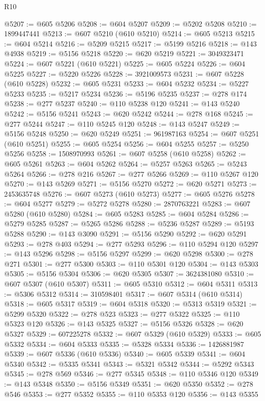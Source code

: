 \begin{lexlean}{R10}
\begin{coremodule}
@5207 := @605 @5206
@5208 := @604 @5207
@5209 := @5202 @5208
@5210 := 1899447441
@5213 := @607 @5210 (@610 @5210)
@5214 := @605 @5213
@5215 := @604 @5214
@5216 := @5209 @5215
@5217 := @5199 @5216
@5218 := @143 @4938
@5219 := @5156 @5218
@5220 := @620 @5219
@5221 := 3049323471
@5224 := @607 @5221 (@610 @5221)
@5225 := @605 @5224
@5226 := @604 @5225
@5227 := @5220 @5226
@5228 := 3921009573
@5231 := @607 @5228 (@610 @5228)
@5232 := @605 @5231
@5233 := @604 @5232
@5234 := @5227 @5233
@5235 := @5217 @5234
@5236 := @5196 @5235
@5237 := @278 @174
@5238 := @277 @5237
@5240 := @110 @5238 @120
@5241 := @143 @5240
@5242 := @5156 @5241
@5243 := @620 @5242
@5244 := @278 @168
@5245 := @277 @5244
@5247 := @110 @5245 @120
@5248 := @143 @5247
@5249 := @5156 @5248
@5250 := @620 @5249
@5251 := 961987163
@5254 := @607 @5251 (@610 @5251)
@5255 := @605 @5254
@5256 := @604 @5255
@5257 := @5250 @5256
@5258 := 1508970993
@5261 := @607 @5258 (@610 @5258)
@5262 := @605 @5261
@5263 := @604 @5262
@5264 := @5257 @5263
@5265 := @5243 @5264
@5266 := @278 @216
@5267 := @277 @5266
@5269 := @110 @5267 @120
@5270 := @143 @5269
@5271 := @5156 @5270
@5272 := @620 @5271
@5273 := 2453635748
@5276 := @607 @5273 (@610 @5273)
@5277 := @605 @5276
@5278 := @604 @5277
@5279 := @5272 @5278
@5280 := 2870763221
@5283 := @607 @5280 (@610 @5280)
@5284 := @605 @5283
@5285 := @604 @5284
@5286 := @5279 @5285
@5287 := @5265 @5286
@5288 := @5236 @5287
@5289 := @5193 @5288
@5290 := @143 @3090
@5291 := @5156 @5290
@5292 := @620 @5291
@5293 := @278 @403
@5294 := @277 @5293
@5296 := @110 @5294 @120
@5297 := @143 @5296
@5298 := @5156 @5297
@5299 := @620 @5298
@5300 := @278 @271
@5301 := @277 @5300
@5303 := @110 @5301 @120
@5304 := @143 @5303
@5305 := @5156 @5304
@5306 := @620 @5305
@5307 := 3624381080
@5310 := @607 @5307 (@610 @5307)
@5311 := @605 @5310
@5312 := @604 @5311
@5313 := @5306 @5312
@5314 := 310598401
@5317 := @607 @5314 (@610 @5314)
@5318 := @605 @5317
@5319 := @604 @5318
@5320 := @5313 @5319
@5321 := @5299 @5320
@5322 := @278 @523
@5323 := @277 @5322
@5325 := @110 @5323 @120
@5326 := @143 @5325
@5327 := @5156 @5326
@5328 := @620 @5327
@5329 := 607225278
@5332 := @607 @5329 (@610 @5329)
@5333 := @605 @5332
@5334 := @604 @5333
@5335 := @5328 @5334
@5336 := 1426881987
@5339 := @607 @5336 (@610 @5336)
@5340 := @605 @5339
@5341 := @604 @5340
@5342 := @5335 @5341
@5343 := @5321 @5342
@5344 := @5292 @5343
@5345 := @278 @569
@5346 := @277 @5345
@5348 := @110 @5346 @120
@5349 := @143 @5348
@5350 := @5156 @5349
@5351 := @620 @5350
@5352 := @278 @546
@5353 := @277 @5352
@5355 := @110 @5353 @120
@5356 := @143 @5355

\end{coremodule}
\end{lexlean}
